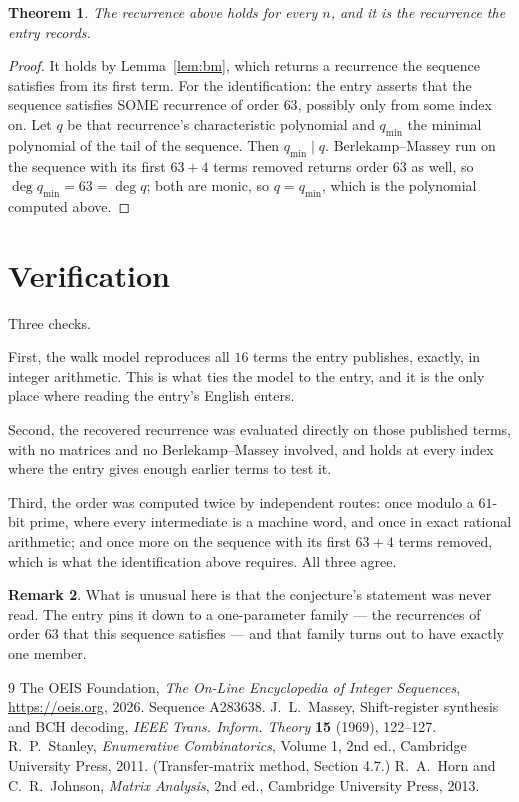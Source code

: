 \documentclass[11pt,a4paper]{article}
\theoremstyle{plain}
\newtheorem{theorem}{Theorem}
\theoremstyle{definition}
\newtheorem{remark}[theorem]{Remark}
\begin{document}
\begin{theorem}
The recurrence above holds for every $n$, and it is the recurrence the entry records.
\end{theorem}

\begin{proof}
It holds by Lemma~\ref{lem:bm}, which returns a recurrence the sequence satisfies from its
first term. For the identification: the entry asserts that the sequence satisfies SOME
recurrence of order $63$, possibly only from some index on. Let $q$ be that recurrence's
characteristic polynomial and $q_{\min}$ the minimal polynomial of the tail of the sequence.
Then $q_{\min}\mid q$. Berlekamp--Massey run on the sequence with its first $63+4$ terms
removed returns order $63$ as well, so $\deg q_{\min}=63=\deg q$; both are monic, so
$q=q_{\min}$, which is the polynomial computed above.
\end{proof}

\section{Verification}

Three checks.

First, the walk model reproduces all $16$ terms the entry publishes, exactly, in integer
arithmetic. This is what ties the model to the entry, and it is the only place where reading
the entry's English enters.

Second, the recovered recurrence was evaluated directly on those published terms, with no
matrices and no Berlekamp--Massey involved, and holds at every index where the entry gives
enough earlier terms to test it.

Third, the order was computed twice by independent routes: once modulo a $61$-bit prime, where
every intermediate is a machine word, and once in exact rational arithmetic; and once more on
the sequence with its first $63+4$ terms removed, which is what the identification above
requires. All three agree.

\begin{remark}
What is unusual here is that the conjecture's statement was never read. The entry pins it down
to a one-parameter family --- the recurrences of order $63$ that this sequence satisfies
--- and that family turns out to have exactly one member.
\end{remark}

\begin{thebibliography}{9}
 The OEIS Foundation, \emph{The On-Line Encyclopedia of Integer
Sequences}, \url{https://oeis.org}, 2026. Sequence A283638.
 J.~L.~Massey, Shift-register synthesis and BCH decoding, \emph{IEEE
Trans. Inform. Theory} \textbf{15} (1969), 122--127.
 R.~P.~Stanley, \emph{Enumerative Combinatorics}, Volume 1, 2nd ed.,
Cambridge University Press, 2011. (Transfer-matrix method, Section 4.7.)
 R.~A.~Horn and C.~R.~Johnson, \emph{Matrix Analysis}, 2nd ed., Cambridge
University Press, 2013.
\end{thebibliography}
\end{document}
